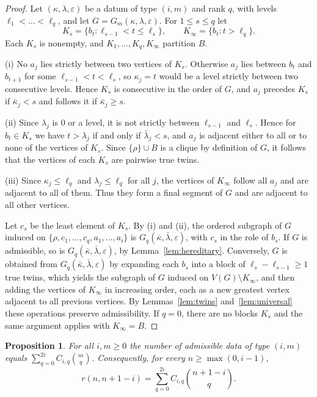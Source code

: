 \documentclass[11pt]{amsart}
\newtheorem{proposition}[theorem]{Proposition}
\theoremstyle{definition}
\theoremstyle{remark}
\numberwithin{equation}{section}
\newcommand{\bk}{\bar\kappa}
\newcommand{\bl}{\bar\lambda}
\begin{document}
\begin{proof}
Let $(\kappa,\lambda,\varepsilon)$ be a datum of type $(i,m)$ and rank $q$, with levels $\ell_1<\dots<\ell_q$, and let $G=G_m(\kappa,\lambda,\varepsilon)$. For $1\le s\le q$ let
\[
K_s=\{b_t:\ell_{s-1}<t\le\ell_s\},\qquad K_\infty=\{b_t:t>\ell_q\}.
\]
Each $K_s$ is nonempty, and $K_1,\dots,K_q,K_\infty$ partition $B$.

(i) No $a_j$ lies strictly between two vertices of $K_s$. Otherwise $a_j$ lies between $b_t$ and $b_{t+1}$ for some $\ell_{s-1}<t<\ell_s$, so $\kappa_j=t$ would be a level strictly between two consecutive levels. Hence $K_s$ is consecutive in the order of $G$, and $a_j$ precedes $K_s$ if $\bk_j<s$ and follows it if $\bk_j\ge s$.

(ii) Since $\lambda_j$ is $0$ or a level, it is not strictly between $\ell_{s-1}$ and $\ell_s$. Hence for $b_t\in K_s$ we have $t>\lambda_j$ if and only if $\bl_j<s$, and $a_j$ is adjacent either to all or to none of the vertices of $K_s$. Since $\{\rho\}\cup B$ is a clique by definition of $G$, it follows that the vertices of each $K_s$ are pairwise true twins.

(iii) Since $\kappa_j\le\ell_q$ and $\lambda_j\le\ell_q$ for all $j$, the vertices of $K_\infty$ follow all $a_j$ and are adjacent to all of them. Thus they form a final segment of $G$ and are adjacent to all other vertices.

Let $c_s$ be the least element of $K_s$. By (i) and (ii), the ordered subgraph of $G$ induced on $\{\rho,c_1,\dots,c_q,a_1,\dots,a_i\}$ is $G_q(\bk,\bl,\varepsilon)$, with $c_s$ in the role of $b_s$. If $G$ is admissible, so is $G_q(\bk,\bl,\varepsilon)$, by Lemma~\ref{lem:hereditary}. Conversely, $G$ is obtained from $G_q(\bk,\bl,\varepsilon)$ by expanding each $b_s$ into a block of $\ell_s-\ell_{s-1}\ge1$ true twins, which yields the subgraph of $G$ induced on $V(G)\setminus K_\infty$, and then adding the vertices of $K_\infty$ in increasing order, each as a new greatest vertex adjacent to all previous vertices. By Lemmas~\ref{lem:twins} and~\ref{lem:universal} these operations preserve admissibility. If $q=0$, there are no blocks $K_s$ and the same argument applies with $K_\infty=B$.
\end{proof}

\begin{proposition}\label{prop:expansion}
For all $i,m\ge0$ the number of admissible data of type $(i,m)$ equals $\sum_{q=0}^{2i}C_{i,q}\binom{m}{q}$. Consequently, for every $n\ge\max(0,i-1)$,
\begin{equation}\label{eq:expansion}
r(n,n+1-i)=\sum_{q=0}^{2i}C_{i,q}\binom{n+1-i}{q}.
\end{equation}
\end{proposition}
\end{document}
